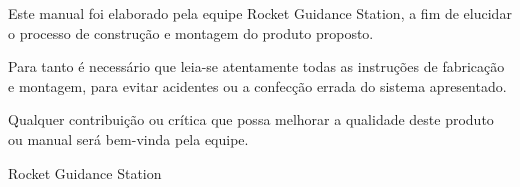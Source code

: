\documentclass[a4paper,pagesize,12pt,bibtotoc,pointlessnumbers,
normalheadings,DIV=11,twoside=false]{scrbook}
\begin{document}
\begin{center}

	\Large{\parbox{12cm}{
		\begin{raggedright}
		{\Large 
			Este manual foi elaborado pela equipe Rocket Guidance Station, a fim de elucidar o processo de construção e montagem do produto proposto. 
			\vspace*{1cm}
			
			Para tanto é necessário que leia-se atentamente todas as instruções de fabricação e montagem, para evitar acidentes ou a confecção errada do sistema apresentado.
			\vspace*{1cm}
			
			Qualquer contribuição ou crítica que possa melhorar a qualidade deste produto ou manual será bem-vinda pela equipe.
		}
	
		\vspace{.5cm}\hfill{Rocket Guidance Station}
		\end{raggedright}
	}
}
\end{center}

\tableofcontents

\newpage







\end{document}
